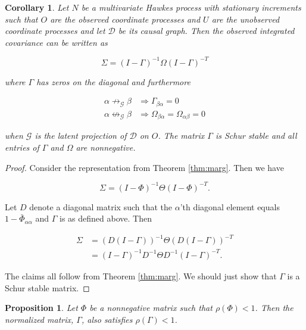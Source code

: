 \documentclass[accepted]{uai2021} %
\newtheorem{cor}[thm]{Corollary}
\newtheorem{prop}[thm]{Proposition}
\begin{document}
\begin{cor}
	Let $N$ be a multivariate Hawkes process with stationary increments such 
	that $O$ are the 
	observed 
	coordinate processes and $U$ are the unobserved coordinate processes and 
	let $\mathcal{D}$ be its causal graph. Then the observed integrated 
	covariance can be written as
	
	$$
	\Sigma = (I - \Gamma)^{-1}\Omega (I - \Gamma)^{-T}
	$$
	
	\noindent where $\Gamma$ has zeros on the diagonal and furthermore
	
	\begin{align*}
		\alpha \not\rightarrow_\mathcal{G} \beta & \Rightarrow 
		\Gamma_{\beta\alpha} = 0 \\
		\alpha \not\leftrightarrow_\mathcal{G} \beta & \Rightarrow 
		\Omega_{\beta\alpha} = \Omega_{\alpha\beta} = 0 
	\end{align*}
	
	when $\mathcal{G}$ is the latent projection of $\mathcal{D}$ on $O$. The 
	matrix $\Gamma$ is Schur stable and all entries of $\Gamma$ and $\Omega$ 
	are 
	nonnegative.
\end{cor}

\begin{proof}
	Consider the representation from Theorem \ref{thm:marg}. Then we have 
	
	$$
	\Sigma= (I - \Phi)^{-1} \Theta (I - \Phi)^{-T}.
	$$ 
	
	Let $D$ denote a 
	diagonal matrix such that the $\alpha$'th diagonal element equals 
	$1 - \bar{\Phi}_{\alpha\alpha}$ and $\Gamma$ is as defined above. Then
	
	
	\begin{align}
	\Sigma 
	& = (D(I - \Gamma))^{-1}\Theta (D(I - \Gamma))^{-T} \nonumber \\
	& = (I - \Gamma)^{-1}D^{-1}\Theta D^{-1}(I - 
	\Gamma)^{-T}.
	\label{eq:Gtilde}
	\end{align}
	
	The claims all follow from Theorem \ref{thm:marg}. We should just show that 
	$\Gamma$ is a Schur stable matrix.
\end{proof}

\begin{prop}
	Let $\Phi$ be a nonnegative matrix such that $\rho(\Phi) < 1$. Then the 
	normalized matrix, $\Gamma$, also satisfies $\rho(\Gamma) < 1$. 
\end{prop}
\end{document}
